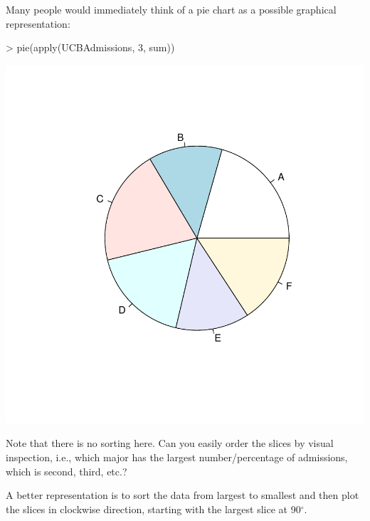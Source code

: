 \documentclass[12pt,letterpaper,final]{article}
\begin{document}
Many people would immediately think of a pie chart as a possible 
graphical representation:
\begin{Schunk}
\begin{Sinput}
> pie(apply(UCBAdmissions, 3, sum))
\end{Sinput}
\end{Schunk}
\includegraphics{lect_main-006}

Note that there is no sorting here. Can you easily order the slices
by visual inspection,
i.e., which major has the largest number/percentage of admissions,
which is second, third, etc.?

A better representation
is to sort the data from largest to smallest and then plot
the slices in clockwise direction, starting with the
largest slice at 90$^\circ$.
\end{document}
